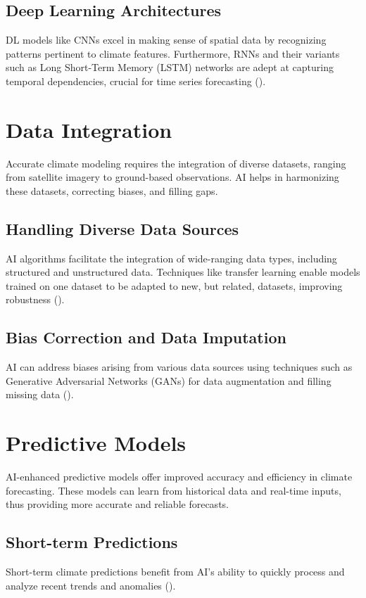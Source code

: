\documentclass[12pt]{article}
\begin{document}
\subsection{Deep Learning Architectures}
DL models like CNNs excel in making sense of spatial data by recognizing patterns pertinent to climate features. Furthermore, RNNs and their variants such as Long Short-Term Memory (LSTM) networks are adept at capturing temporal dependencies, crucial for time series forecasting (\cite{wang2021forecasting}).

\section{Data Integration}
Accurate climate modeling requires the integration of diverse datasets, ranging from satellite imagery to ground-based observations. AI helps in harmonizing these datasets, correcting biases, and filling gaps.

\subsection{Handling Diverse Data Sources}
AI algorithms facilitate the integration of wide-ranging data types, including structured and unstructured data. Techniques like transfer learning enable models trained on one dataset to be adapted to new, but related, datasets, improving robustness (\cite{karpatne2018machine}).

\subsection{Bias Correction and Data Imputation}
AI can address biases arising from various data sources using techniques such as Generative Adversarial Networks (GANs) for data augmentation and filling missing data (\cite{kadow2020artificial}).

\section{Predictive Models}
AI-enhanced predictive models offer improved accuracy and efficiency in climate forecasting. These models can learn from historical data and real-time inputs, thus providing more accurate and reliable forecasts.

\subsection{Short-term Predictions}
Short-term climate predictions benefit from AI's ability to quickly process and analyze recent trends and anomalies (\cite{zhou2020climate}). 
\end{document}

